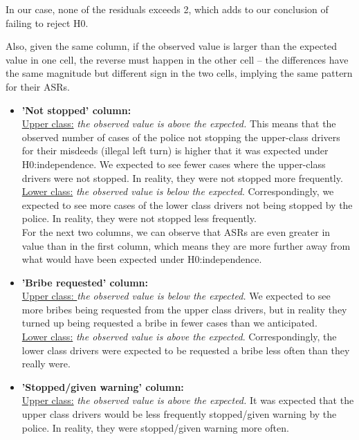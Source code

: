 \documentclass[12pt,letterpaper]{article}
\begin{document}
\begin{enumerate}
In our case, none of the residuals exceeds 2, which adds to our conclusion of failing to reject H0. 

Also, given the same column, if the observed value is larger than the expected value in one cell, the reverse must happen in the other cell -- the differences have the same magnitude but different sign in the two cells, implying the same pattern for their ASRs.

\begin{itemize}
	\item \textbf {'Not stopped' column:} \\
	\underline{Upper class:} \textit{the observed value is above the expected.} This means that the observed number of cases of the police not stopping the upper-class drivers for their misdeeds (illegal left turn) is higher that it was expected under H0:independence. We expected to see fewer cases where the upper-class drivers were not stopped. In reality, they were not stopped more frequently.\\
	
	\underline{Lower class:} \textit {the observed value is below the expected}. Correspondingly, we expected to see more cases of the lower class drivers not being stopped by the police. In reality, they were not stopped less frequently.\\
	
	For the next two columns, we can observe that ASRs are even greater in value than in the first column, which means they are more further away from what would have been expected under H0:independence. 
	
	\item \textbf {'Bribe requested' column:}\\
	\underline{Upper class: }\textit{the observed value is below the expected.} We expected to see more bribes being requested from the upper class drivers, but in reality they turned up being requested a bribe in fewer cases than we anticipated.\\
	
	\underline{Lower class:} \textit {the observed value is above the expected}. Correspondingly, the lower class drivers were expected to be requested a bribe less often than they really were.\\
	\item \textbf {'Stopped/given warning' column:}\\
	\underline{Upper class:} \textit{the observed value is above the expected.} It was expected that the upper class drivers would be less frequently stopped/given warning by the police. In reality, they were stopped/given warning more often.\\
	

\end{itemize}
\end{enumerate}
\end{document}
